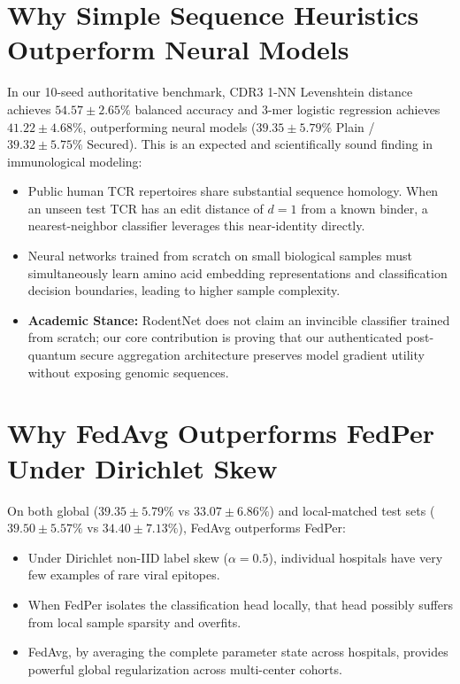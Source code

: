 \documentclass[11pt,a4paper]{report}
\begin{document}
\section{Why Simple Sequence Heuristics Outperform Neural Models}
In our 10-seed authoritative benchmark, CDR3 1-NN Levenshtein distance achieves $54.57 \pm 2.65\%$ balanced accuracy and 3-mer logistic regression achieves $41.22 \pm 4.68\%$, outperforming neural models ($39.35 \pm 5.79\%$ Plain / $39.32 \pm 5.75\%$ Secured). This is an expected and scientifically sound finding in immunological modeling:
\begin{itemize}[itemsep=2pt]
  \item Public human TCR repertoires share substantial sequence homology. When an unseen test TCR has an edit distance of $d=1$ from a known binder, a nearest-neighbor classifier leverages this near-identity directly.
  \item Neural networks trained from scratch on small biological samples must simultaneously learn amino acid embedding representations and classification decision boundaries, leading to higher sample complexity.
  \item \textbf{Academic Stance:} RodentNet does not claim an invincible classifier trained from scratch; our core contribution is proving that our authenticated post-quantum secure aggregation architecture preserves model gradient utility without exposing genomic sequences.
\end{itemize}

\section{Why FedAvg Outperforms FedPer Under Dirichlet Skew}
On both global ($39.35 \pm 5.79\%$ vs $33.07 \pm 6.86\%$) and local-matched test sets ($39.50 \pm 5.57\%$ vs $34.40 \pm 7.13\%$), FedAvg outperforms FedPer:
\begin{itemize}[itemsep=2pt]
  \item Under Dirichlet non-IID label skew ($\alpha=0.5$), individual hospitals have very few examples of rare viral epitopes.
  \item When FedPer isolates the classification head locally, that head possibly suffers from local sample sparsity and overfits.
  \item FedAvg, by averaging the complete parameter state across hospitals, provides powerful global regularization across multi-center cohorts.
\end{itemize}
\end{document}
